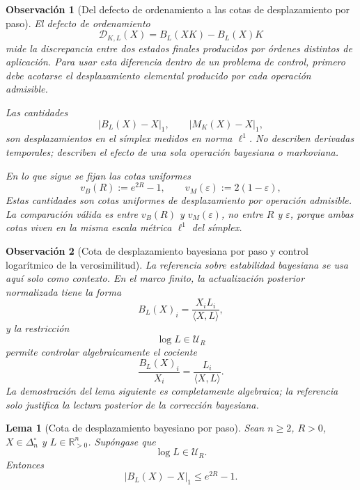 ﻿\documentclass[12pt]{article}
\newtheorem{lema}{Lema}[section]
\newtheorem{observacion}{Observación}[section]
\begin{document}
\begin{observacion}[Del defecto de ordenamiento a las cotas de desplazamiento por paso]
\label{obs:defecto_a_cotas_desplazamiento}
El defecto de ordenamiento
\[
\mathcal D_{K,L}(X)=B_L(XK)-B_L(X)K
\]
mide la discrepancia entre dos estados finales producidos por órdenes distintos de aplicación. Para usar esta diferencia dentro de un problema de control, primero debe acotarse el desplazamiento elemental producido por cada operación admisible.

Las cantidades
\[
\left|B_L(X)-X\right|_1,
\qquad
\left|M_K(X)-X\right|_1,
\]
son desplazamientos en el símplex medidos en norma \(\ell^1\). No describen derivadas temporales; describen el efecto de una sola operación bayesiana o markoviana.

En lo que sigue se fijan las cotas uniformes
\[
v_B(R):=e^{2R}-1,
\qquad
v_M(\varepsilon):=2(1-\varepsilon),
\]
Estas cantidades son cotas uniformes de desplazamiento por operación admisible. La comparación válida es entre \(v_B(R)\) y \(v_M(\varepsilon)\), no entre \(R\) y \(\varepsilon\), porque ambas cotas viven en la misma escala métrica \(\ell^1\) del símplex.
\end{observacion}

\begin{observacion}[Cota de desplazamiento bayesiana por paso y control logarítmico de la verosimilitud]
La referencia sobre estabilidad bayesiana \citep{Sprungk2020} se usa aquí solo como contexto. En el marco finito, la actualización posterior normalizada tiene la forma
\[
B_L(X)_i
=
\frac{X_iL_i}{\langle X,L\rangle},
\]
y la restricción
\[
\log L\in\mathcal U_R
\]
permite controlar algebraicamente el cociente
\[
\frac{B_L(X)_i}{X_i}
=
\frac{L_i}{\langle X,L\rangle}.
\]
La demostración del lema siguiente es completamente algebraica; la referencia solo justifica la lectura posterior de la corrección bayesiana.
\end{observacion}

\begin{lema}[Cota de desplazamiento bayesiano por paso]\label{lem:cota_desplazamiento_bayesiano}
Sean \(n\ge2\), \(R>0\), \(X\in\Delta_n^\circ\) y \(L\in\mathbb R_{>0}^n\). Supóngase que
\[
\log L\in\mathcal U_R.
\]
Entonces
\[
\left|B_L(X)-X\right|_1
\le
e^{2R}-1.
\]
\end{lema}
\end{document}
